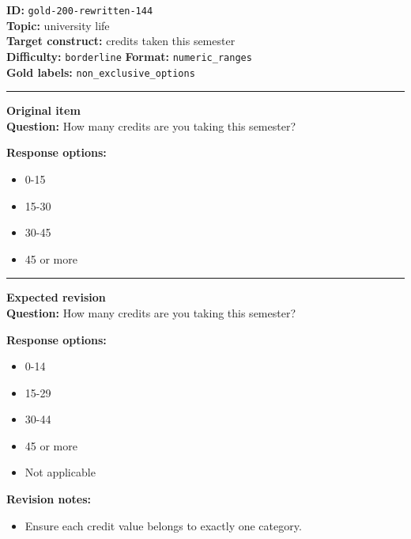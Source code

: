 \documentclass[10pt,a4paper]{article}
\newcommand{\sectionline}{\vspace{0.15em}\hrule\vspace{0.35em}}
\begin{document}
\begin{tcolorbox}[colframe=FlawRed,colback=white,colbacktitle=FlawRed!9,coltitle=black,title={Item 144\hfill Flawed item}]
\textbf{ID:} \texttt{gold-200-rewritten-144}\\
\textbf{Topic:} university life\\
\textbf{Target construct:} credits taken this semester\\
\textbf{Difficulty:} \texttt{borderline} \quad \textbf{Format:} \texttt{numeric\_ranges}\\
\textbf{Gold labels:} \texttt{non\_exclusive\_options}\\
\sectionline
\textbf{Original item}\\
\textbf{Question:} How many credits are you taking this semester?
\par\textbf{Response options:}
\begin{itemize}
\item 0-15
\item 15-30
\item 30-45
\item 45 or more
\end{itemize}
\sectionline
\textbf{Expected revision}\\
\textbf{Question:} How many credits are you taking this semester?
\par\textbf{Response options:}
\begin{itemize}
\item 0-14
\item 15-29
\item 30-44
\item 45 or more
\item Not applicable
\end{itemize}
\par\textbf{Revision notes:}
\begin{itemize}
\item Ensure each credit value belongs to exactly one category.
\end{itemize}
\end{tcolorbox}
\end{document}

